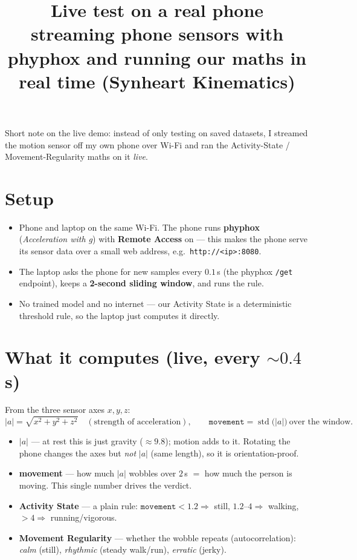 \documentclass[11pt]{article}
\title{Live test on a real phone\\[2pt]
\large streaming phone sensors with phyphox and running our maths in real time
(Synheart Kinematics)}
\date{}
\begin{document}
\maketitle

Short note on the live demo: instead of only testing on saved datasets, I streamed the
motion sensor off my own phone over Wi-Fi and ran the Activity-State / Movement-Regularity
maths on it \emph{live}.

\section{Setup}
\begin{itemize}[noitemsep]
  \item Phone and laptop on the same Wi-Fi. The phone runs \textbf{phyphox}
        (\textit{Acceleration with g}) with \textbf{Remote Access} on --- this makes the
        phone serve its sensor data over a small web address, e.g.\ \texttt{http://<ip>:8080}.
  \item The laptop asks the phone for new samples every $0.1$\,s (the phyphox
        \texttt{/get} endpoint), keeps a \textbf{2-second sliding window}, and runs the rule.
  \item No trained model and no internet --- our Activity State is a deterministic
        threshold rule, so the laptop just computes it directly.
\end{itemize}

\section{What it computes (live, every $\sim\!0.4$\,s)}
From the three sensor axes $x,y,z$:
\[
  |a|=\sqrt{x^2+y^2+z^2}\quad(\text{strength of acceleration}),\qquad
  \texttt{movement}=\operatorname{std}\big(|a|\big)\ \text{over the window}.
\]
\begin{itemize}[noitemsep]
  \item \textbf{$|a|$} --- at rest this is just gravity ($\approx 9.8$); motion adds to it.
        Rotating the phone changes the axes but \emph{not} $|a|$ (same length), so it is
        orientation-proof.
  \item \textbf{movement} --- how much $|a|$ wobbles over $2$\,s $=$ how much the person is
        moving. This single number drives the verdict.
  \item \textbf{Activity State} --- a plain rule: $\texttt{movement}<1.2\Rightarrow$ still,
        $1.2$--$4\Rightarrow$ walking, $>4\Rightarrow$ running/vigorous.
  \item \textbf{Movement Regularity} --- whether the wobble repeats (autocorrelation):
        \emph{calm} (still), \emph{rhythmic} (steady walk/run), \emph{erratic} (jerky).
\end{itemize}
\end{document}
